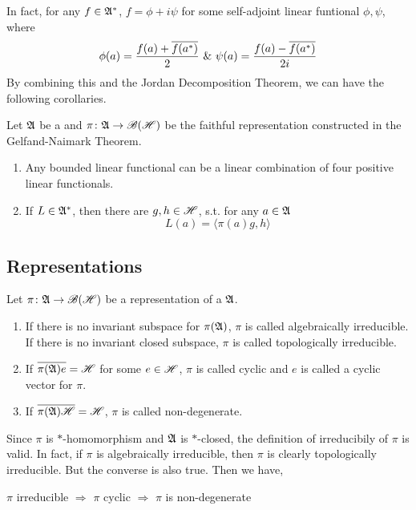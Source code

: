 \documentclass[a4paper,11pt]{report}
\begin{document}
In fact, for any $f \in \mathfrak{A}^{*}$, $f = \phi + i \psi$ for some self-adjoint linear funtional $\phi, \psi$, where
\begin{equation*}
	\phi(a) = \frac{f(a) + \overline{f(a^{*})}}{2} ~\&~ \psi(a) =\frac{f(a) - \overline{f(a^{*})}}{2i}
\end{equation*}
By combining this and the Jordan Decomposition Theorem, we can have the following corollaries.

\begin{cor}
	Let $\mathfrak{A}$ be a \Cs and $\pi \colon \mathfrak{A} \rightarrow \mathscr{B(H)}$ be the faithful representation constructed in the Gelfand-Naimark Theorem.
	\begin{enumerate}[label=\arabic*)]
		\item Any bounded linear functional can be a linear combination of four positive linear functionals.
		\item If $L \in \mathfrak{A}^{*}$, then there are $g,h \in \mathscr{H}$, s.t. for any $a \in \mathfrak{A}$
		\begin{equation*}
			L(a) = \langle \pi(a)g,h \rangle
		\end{equation*}
	\end{enumerate}
\end{cor}

\subsection{Representations}

\begin{defn}
	Let $\pi \colon \mathfrak{A} \rightarrow \mathscr{B(H)}$ be a representation of a \Cs $\mathfrak{A}$.
	\begin{enumerate}[label=\arabic*)]
		\item If there is no invariant subspace for $\pi(\mathfrak{A})$, $\pi$ is called algebraically irreducible. If there is no invariant closed subspace, $\pi$ is called topologically irreducible.
		\item If $\overline{\pi(\mathfrak{A})e} = \mathscr{H}$ for some $e \in \mathscr{H}$, $\pi$ is called cyclic and $e$ is called a cyclic vector for $\pi$.
		\item If $\overline{\pi(\mathfrak{A})\mathscr{H}} = \mathscr{H}$, $\pi$ is called non-degenerate.
	\end{enumerate}
\end{defn}
\begin{rem}
	Since $\pi$ is $*$-homomorphism and $\mathfrak{A}$ is $*$-closed, the definition of irreducibily of $\pi$ is valid. In fact, if $\pi$ is algebraically irreducible, then $\pi$ is clearly topologically irreducible. But the converse is also true. Then we have,
	\begin{center}
		$\pi$ irreducible $\Rightarrow$ $\pi$ cyclic $\Rightarrow$ $\pi$ is non-degenerate
	\end{center}
\end{rem}
\end{document}
